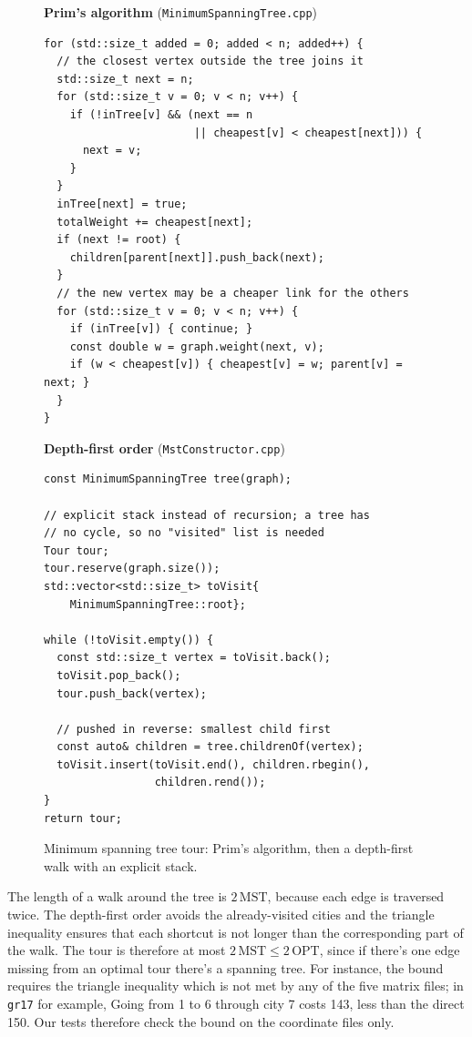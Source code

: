 \documentclass[10pt,a4paper]{article}
\begin{document}
\begin{figure}[H]
\noindent
\begin{minipage}[t]{0.52\linewidth}
\vspace{0pt}
{\footnotesize\raggedright\textbf{Prim's algorithm} (\texttt{MinimumSpanningTree.cpp})\par}
\begin{lstlisting}[style=side]
for (std::size_t added = 0; added < n; added++) {
  // the closest vertex outside the tree joins it
  std::size_t next = n;
  for (std::size_t v = 0; v < n; v++) {
    if (!inTree[v] && (next == n
                       || cheapest[v] < cheapest[next])) {
      next = v;
    }
  }
  inTree[next] = true;
  totalWeight += cheapest[next];
  if (next != root) {
    children[parent[next]].push_back(next);
  }
  // the new vertex may be a cheaper link for the others
  for (std::size_t v = 0; v < n; v++) {
    if (inTree[v]) { continue; }
    const double w = graph.weight(next, v);
    if (w < cheapest[v]) { cheapest[v] = w; parent[v] = next; }
  }
}
\end{lstlisting}
\end{minipage}\hfill
\begin{minipage}[t]{0.45\linewidth}
\vspace{0pt}
{\footnotesize\raggedright\textbf{Depth-first order} (\texttt{MstConstructor.cpp})\par}
\begin{lstlisting}[style=side]
const MinimumSpanningTree tree(graph);

// explicit stack instead of recursion; a tree has
// no cycle, so no "visited" list is needed
Tour tour;
tour.reserve(graph.size());
std::vector<std::size_t> toVisit{
    MinimumSpanningTree::root};

while (!toVisit.empty()) {
  const std::size_t vertex = toVisit.back();
  toVisit.pop_back();
  tour.push_back(vertex);

  // pushed in reverse: smallest child first
  const auto& children = tree.childrenOf(vertex);
  toVisit.insert(toVisit.end(), children.rbegin(),
                 children.rend());
}
return tour;
\end{lstlisting}
\end{minipage}
\caption{Minimum spanning tree tour: Prim's algorithm, then a depth-first walk with an explicit stack.}
\label{fig-mst}
\end{figure}

The length of a walk around the tree is $2\,\mathrm{MST}$, because each edge is traversed twice. The depth-first order avoids the already-visited cities and the triangle inequality ensures that each shortcut is not longer than the corresponding part of the walk. The tour is therefore at most $2\,\mathrm{MST} \le 2\,\mathrm{OPT}$, since if there's one edge missing from an optimal tour there's a spanning tree. For instance, the bound requires the triangle inequality which is not met by any of the five matrix files; in \texttt{gr17} for example, Going from 1 to 6 through city 7 costs 143, less than the direct 150. Our tests therefore check the bound on the coordinate files only.
\end{document}
